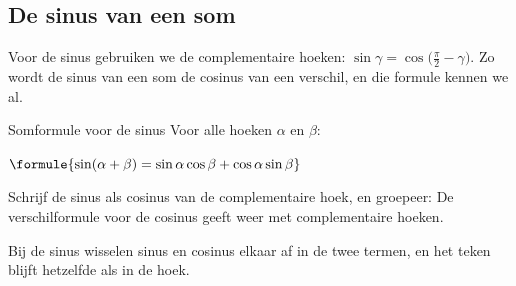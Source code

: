 \begin{oefeningen}
\end{oefeningen}

\subsection{De sinus van een som}

Voor de sinus gebruiken we de complementaire hoeken: $\sin\gamma = \cos\bigl(\frac{\pi}{2} - \gamma\bigr)$. Zo wordt de sinus van een som de cosinus van een verschil, en die formule kennen we al.

\begin{theorie}
\begin{stelling}{Somformule voor de sinus}
Voor alle hoeken $\alpha$ en $\beta$:

\vspace{1mm}
\qquad $\formule{\sin(\alpha + \beta) = \sin\alpha\cos\beta + \cos\alpha\sin\beta}$
\end{stelling}
\begin{bewijs}
Schrijf de sinus als cosinus van de complementaire hoek, en groepeer:
De verschilformule voor de cosinus geeft
weer met complementaire hoeken.
\end{bewijs}
\end{theorie}

Bij de sinus wisselen sinus en cosinus elkaar af in de twee termen, en het teken blijft hetzelfde als in de hoek.


